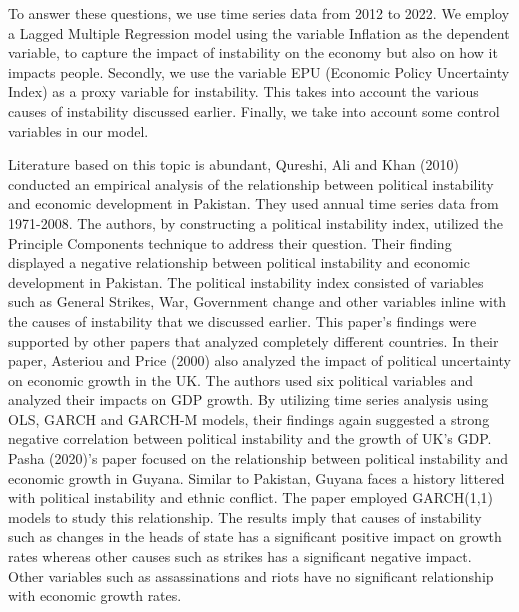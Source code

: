 \documentclass[11pt]{article}
\begin{document}
To answer these questions, we use time series data from 2012 to 2022. We employ a Lagged Multiple Regression model using the variable Inflation as the dependent variable, to capture the impact of instability on the economy but also on how it impacts people. Secondly, we use the variable EPU (Economic Policy Uncertainty Index) as a proxy variable for instability. This takes into account the various causes of instability discussed earlier. Finally, we take into account some control variables in our model. \newline

Literature based on this topic is abundant, Qureshi, Ali and Khan (2010) conducted an empirical analysis of the relationship between political instability and economic development in Pakistan. They used annual time series data from 1971-2008. The authors, by constructing a political instability index, utilized the Principle Components technique to address their question. Their finding displayed a negative relationship between political instability and economic development in Pakistan. The political instability index consisted of variables such as General Strikes, War, Government change and other variables inline with the causes of instability that we discussed earlier. This paper’s findings were supported by other papers that analyzed completely different countries. In their paper, Asteriou and Price (2000) also analyzed the impact of political uncertainty on economic growth in the UK. The authors used six political variables and analyzed their impacts on GDP growth. By utilizing time series analysis using OLS, GARCH and GARCH-M models, their findings again suggested a strong negative correlation between political instability and the growth of UK’s GDP. Pasha (2020)’s paper focused on the relationship between political instability and economic growth in Guyana. Similar to Pakistan, Guyana faces a history littered with political instability and ethnic conflict. The paper employed GARCH(1,1) models to study this relationship. The results imply that causes of instability such as changes in the heads of state has a significant positive impact on growth rates whereas other causes such as strikes has a significant negative impact. Other variables such as assassinations and riots have no significant relationship with economic growth rates. \newline
\end{document}
